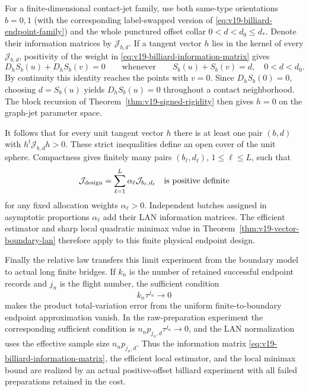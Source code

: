 For a finite-dimensional contact-jet family, use both same-type
orientations $b=0,1$ (with the corresponding label-swapped version of
\eqref{eq:v19-billiard-endpoint-family}) and the whole punctured offset
collar $0<d<d_0\le d_*$.  Denote their information matrices by
$\mathcal J_{b,d}$.  If a tangent vector $h$ lies in the kernel of every
$\mathcal J_{b,d}$, positivity of the weight in
\eqref{eq:v19-billiard-information-matrix} gives
\[
 D_hS_b(u)+D_hS_b(v)=0
 \qquad\text{whenever}\qquad S_b(u)+S_b(v)=d,
 \quad 0<d<d_0.
\]
By continuity this identity reaches the points with $v=0$.  Since
$D_hS_b(0)=0$, choosing $d=S_b(u)$ yields $D_hS_b(u)=0$ throughout a
contact neighborhood.  The block recursion of
Theorem~\ref{thm:v19-signed-rigidity} then gives $h=0$ on the graph-jet
parameter space.

It follows that for every unit tangent vector $h$ there is at least one
pair $(b,d)$ with $h^t\mathcal J_{b,d}h>0$.  These strict inequalities
define an open cover of the unit sphere.  Compactness gives finitely many
pairs $(b_\ell,d_\ell)$, $1\le\ell\le L$, such that
\begin{equation}\label{eq:v19-finite-design-information}
 \mathcal J_{\rm design}=
       \sum_{\ell=1}^L\alpha_\ell\mathcal J_{b_\ell,d_\ell}
       \quad\text{is positive definite}
\end{equation}
for any fixed allocation weights $\alpha_\ell>0$.  Independent batches
assigned in asymptotic proportions $\alpha_\ell$ add their LAN information
matrices.  The efficient estimator and sharp local quadratic minimax value
in Theorem~\ref{thm:v19-vector-boundary-lan} therefore apply to this finite
physical endpoint design.

Finally the relative law transfers this limit experiment from the boundary
model to actual long finite bridges.  If $k_n$ is the number of retained
successful endpoint records and $j_n$ is the flight number, the sufficient
condition
\begin{equation}\label{eq:v19-finite-bridge-lan-transfer}
                    k_n\tau^{j_n}\longrightarrow0
\end{equation}
makes the product total-variation error from the uniform finite-to-boundary
endpoint approximation vanish.  In the raw-preparation experiment the
corresponding sufficient condition is
$n_np_{j_n,d}\tau^{j_n}\to0$, and the LAN normalization uses the effective
sample size $n_np_{j_n,d}$.  Thus the information matrix
\eqref{eq:v19-billiard-information-matrix}, the efficient local estimator,
and the local minimax bound are realized by an actual positive-offset
billiard experiment with all failed preparations retained in the cost.
